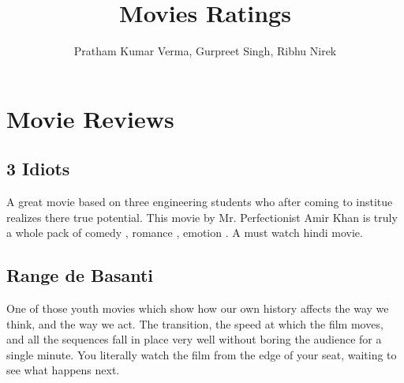 \documentclass{article}
\title{Movies Ratings}
\author{Pratham Kumar Verma, Gurpreet Singh, Ribhu Nirek}
\date{}
\begin{document}
\maketitle

\section*{Movie Reviews}
	
	\subsection*{3 Idiots}
	    A great movie based on three engineering students who after coming to institue realizes there true potential. This movie by Mr. Perfectionist Amir Khan is truly a whole pack of comedy , romance , emotion . A must watch hindi movie.

	\subsection*{Range de Basanti}

		One of those youth movies which show how our own history affects the way we think, and the way we act. The transition, the speed at which the film moves, and all the sequences fall in place very well without boring the audience for a single minute. You literally watch the film from the edge of your seat, waiting to see what happens next.
\end{document}

